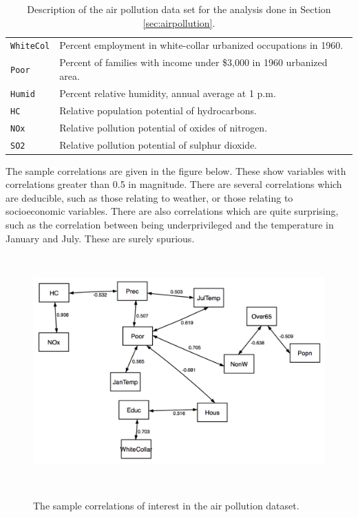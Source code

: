 \begin{table}[H]
\begin{tabular}{p{2.1cm}p{11.5cm}}
\texttt{WhiteCol} & Percent employment in white-collar urbanized occupations in 1960.                                    \\
\texttt{Poor}         & Percent of families with income under \$3,000 in 1960 urbanized area.                                     \\
\texttt{Humid}        & Percent relative humidity, annual average at 1 p.m.                                                      \\
\texttt{HC}           & Relative population potential of hydrocarbons.                                                            \\
\texttt{NOx}          & Relative pollution potential of oxides of nitrogen.                                                      \\
\texttt{SO2}          & Relative pollution potential of sulphur dioxide.                                                         
\end{tabular}
\label{tab:airpollution}
\caption{Description of the air pollution data set for the analysis done in Section \ref{sec:airpollution}.}
\end{table}
\vspace{-5pt}

The sample correlations are given in the figure below. These show variables with correlations greater than 0.5 in magnitude. There are several correlations which are deducible, such as those relating to weather, or those relating to socioeconomic variables. There are also correlations which are quite surprising, such as the correlation between being underprivileged and the temperature in January and July. These are surely spurious.

\begin{figure}[H]
	\centering
	\includegraphics[height=3.5in]{figure/pollution-cor}
	\label{fig:pollution-cor}
	\caption{The sample correlations of interest in the air pollution dataset. }
\end{figure}


